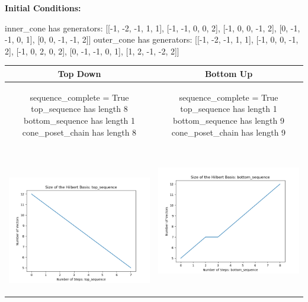 \documentclass[10pt]{article}
\begin{document}
\textbf{Initial Conditions:}
\begin{SAGE}
inner_cone has generators: 
[[-1, -2, -1, 1, 1], [-1, -1, 0, 0, 2], [-1, 0, 0, -1, 2], [0, -1, -1, 0, 1], [0, 0, -1, -1, 2]]
outer_cone has generators: 
[[-1, -2, -1, 1, 1], [-1, 0, 0, -1, 2], [-1, 0, 2, 0, 2], [0, -1, -1, 0, 1], [1, 2, -1, -2, 2]]

\end{SAGE}
\begin{tabular}{c|c}
\textbf{Top Down} & \textbf{Bottom Up} \\ \hline  
\begin{SAGE}
	sequence_complete = True
	top_sequence has length 8
	bottom_sequence has length 1
	cone_poset_chain has length 8
\end{SAGE} 
&
\begin{SAGE}
	sequence_complete = True
	top_sequence has length 1
	bottom_sequence has length 9
	cone_poset_chain has length 9
\end{SAGE} 
\\ \hline
\
\begin{minipage}{.45\textwidth}
\includegraphics[width=\textwidth]{"DATA/5d/5 generators 2 bound J/top_sequence SIZE"}
\end{minipage} &
\begin{minipage}{.45\textwidth}
\includegraphics[width=\textwidth]{"DATA/5d/5 generators 2 bound J bottomup/bottom_sequence SIZE"}

\end{minipage}
\end{tabular}
\end{document}
